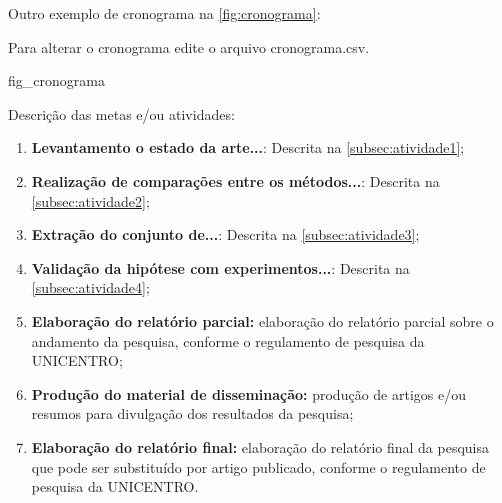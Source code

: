 Outro exemplo de cronograma na \autoref{fig:cronograma}:

Para alterar o cronograma edite o arquivo cronograma.csv.

{fig_cronograma}


Descrição das metas e/ou atividades:
\begin{enumerate}
    \item \textbf{Levantamento o estado da arte...}: Descrita na \autoref{subsec:atividade1};
    \item \textbf{Realização de comparações entre os métodos...}: Descrita na \autoref{subsec:atividade2};
    \item \textbf{Extração do conjunto de...}: Descrita na \autoref{subsec:atividade3};    
    \item \textbf{Validação da hipótese com experimentos...}: Descrita na \autoref{subsec:atividade4};
    \item \textbf{Elaboração do relatório parcial:} elaboração do relatório parcial sobre o andamento da pesquisa, conforme o regulamento de pesquisa da UNICENTRO;
    \item \textbf{Produção do material de disseminação:} produção de artigos e/ou resumos para divulgação dos resultados da pesquisa;
    \item \textbf{Elaboração do relatório final:} elaboração do relatório final da pesquisa que pode ser substituído por artigo publicado, conforme o regulamento de pesquisa da UNICENTRO.
\end{enumerate}